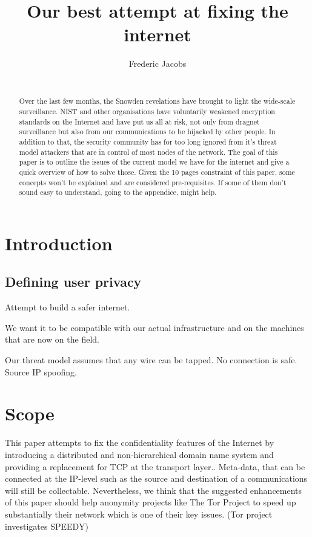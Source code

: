\documentclass{vldb}
\begin{document}
\title{Our best attempt at fixing the internet}



\author{
\alignauthor
Frederic Jacobs\\
\\
}

\maketitle

\begin{abstract}
Over the last few months, the Snowden revelations have brought to light the wide-scale surveillance. NIST and other organisations have voluntarily weakened encryption standards on the Internet and have put us all at risk, not only from dragnet surveillance but also from our communications to be hijacked by other people.
In addition to that, the security community has for too long ignored from it's threat model attackers that are in control of most nodes of the network. The goal of this paper is to outline the issues of the current model we have for the internet and give a quick overview of how to solve those. Given the 10 pages constraint of this paper, some concepts won't be explained and are considered pre-requisites. If some of them don't sound easy to understand, going to the appendice, might help. 
\end{abstract}

\section{Introduction}

\subsection{Defining user privacy}
Attempt to build a safer internet.

We want it to be compatible with our actual infrastructure and on the machines that are now on the field.

Our threat model assumes that any wire can be tapped. No connection is safe. Source IP spoofing.

\section{Scope}
This paper attempts to fix the confidentiality features of the Internet by introducing a distributed and non-hierarchical domain name system and providing a replacement for TCP at the transport layer.. Meta-data, that can be connected at the IP-level such as the source and destination of a communications will still be collectable. Nevertheless, we think that the suggested enhancements of this paper should help anonymity projects like The Tor Project to speed up substantially their network which is one of their key issues. (Tor project investigates SPEEDY)
\end{document}
